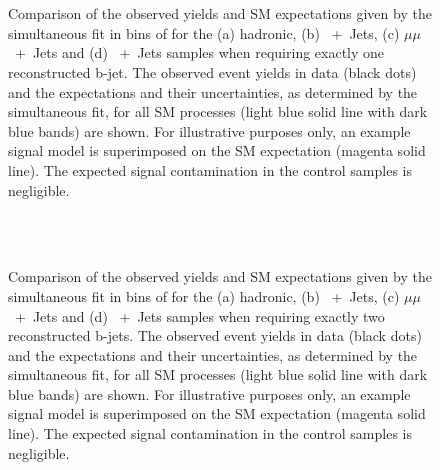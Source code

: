 \newpage
\begin{figure}[h!]
  \begin{center}
     \\
     \\
    \caption{\label{fig:best-fit-1-btag} Comparison of the observed
      yields and SM expectations given by the simultaneous fit in bins
      of \HT for the (a) hadronic, (b) \Pmu~+~Jets, (c) $\mu\mu$~+~Jets and (d) \Pphoton~+~Jets
      samples when requiring exactly one reconstructed
      b-jet. The observed event yields in data (black dots) and the
      expectations and their uncertainties, as determined by the
      simultaneous fit, for all SM processes (light blue solid line
      with dark blue bands) are shown. For illustrative purposes only,
      an example signal model is superimposed on the SM expectation
      (magenta solid line). The expected signal contamination in the
      control samples is negligible.}
  \end{center}
\end{figure}

\newpage
\begin{figure}[h!]
  \begin{center}
     \\
     \\
    \caption{\label{fig:best-fit-2-btag} Comparison of the observed
      yields and SM expectations given by the simultaneous fit in bins
      of \HT for the (a) hadronic, (b) \Pmu~+~Jets, (c) $\mu\mu$~+~Jets and (d) \Pphoton~+~Jets
      samples when requiring exactly two reconstructed
      b-jets. The observed event yields in data (black dots) and the
      expectations and their uncertainties, as determined by the
      simultaneous fit, for all SM processes (light blue solid line
      with dark blue bands) are shown. For illustrative purposes only,
      an example signal model is superimposed on the SM expectation
      (magenta solid line). The expected signal contamination in the
      control samples is negligible.}
  \end{center}
\end{figure}

